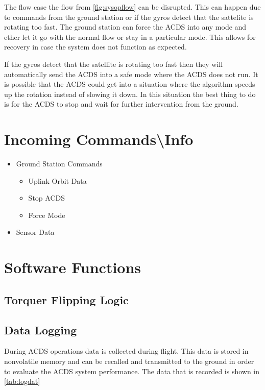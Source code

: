 The flow case the flow from \autoref{fig:sysopflow} can be disrupted. This can happen due to commands from the ground station or if the gyros detect that the sattelite is rotating too fast. The ground station can force the \ac{ACDS} into any mode and ether let it go with the normal flow or stay in a particular mode. This allows for recovery in case the system does not function as expected.

If the gyros detect that the satellite is rotating too fast then they will automatically send the \ac{ACDS} into a safe mode where the \ac{ACDS} does not run. It is possible that the \ac{ACDS} could get into a situation where the algorithm speeds up the rotation instead of slowing it down. In this situation the best thing to do is for the \ac{ACDS} to stop and wait for further intervention from the ground.

\section{Incoming Commands\textbackslash Info}

\begin{itemize}
    \item Ground Station Commands
        \begin{itemize}
            \item Uplink Orbit Data
            \item Stop \ac{ACDS}
            \item Force Mode
        \end{itemize}
    \item Sensor Data
\end{itemize}

\section{Software Functions}

\subsection{Torquer Flipping Logic}

\subsection{Data Logging}

During \ac{ACDS} operations data is collected during flight. This data is stored in nonvolatile memory and can be recalled and transmitted to the ground in order to evaluate the \ac{ACDS} system performance. The data that is recorded is shown in \autoref{tab:logdat}

